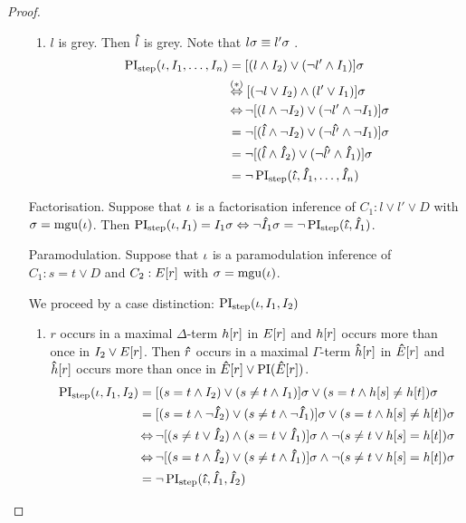 \begin{proof}
\begin{itemize}
\begin{enumerate}
				\item $l$ is grey. Then $\bm\hat{l}$ is grey. 
					Note that $l\sigma \equiv l'\sigma$ \markB.
					\nopagebreak 
					\begin{align*}
						\PIstep(\inference, I_1, \dots, I_n) 
						&=  [(l \land I_2) \lor (\lnot l'  \land I_1)]\sigma\\
						&\hspace{-1pt}\stackrel{\mathclap{\markB}}\semiff[(\lnot l \lor I_2) \land (l' \lor I_1)]\sigma\\
						 &\semiff \lnot [(l \land \lnot I_2) \lor (\lnot l'  \land \lnot I_1)]\sigma\\
						 &= \lnot [(\p l \land\lnot I_2 ) \lor (\lnot \p{l'}\land \lnot I_1 )]\sigma\\
						 &= \lnot  [(\p l \land \p I_2 ) \lor (\lnot \p{l'} \land \p I_1)]\sigma \\
						 &= \lnot \PIstep(\p \inference, \p I_1, \dots, \p I_n)
					\end{align*}
			\end{enumerate}

				\item[Factorisation.]
					Suppose that $\iota$ is a factorisation inference of $C_1: l \lor l' \lor D$
					with $\sigma = \operatorname{mgu}(\iota)$.
					Then $\operatorname{PI}_{\mathrm{step}}(\iota, I_1) = I_1\sigma \;{\operatorname{\Leftrightarrow}}\; \lnot \bm\hat{I}_1\sigma = \lnot \operatorname{PI}_{\mathrm{step}}(\bm\hat{\iota}, \bm\hat{I}_1)$.

				\item[Paramodulation.]
					Suppose that $\iota$ is a paramodulation inference of $C_1: s=t \lor D$ and $C_2: E[r]$ 
					with $\sigma = \operatorname{mgu}(\iota)$.

					We proceed by a case distinction:
					$\operatorname{PI}_{\mathrm{step}}(\iota, I_1, I_2)$

					\begin{enumerate}
						\item $r$ occurs in a maximal $\Delta$-term $h[r]$ in $E[r]$ and $h[r]$ occurs more than once in $I_2 \lor E[r]$.
							Then $\bm\hat{r}$ occurs in a maximal $\Gamma$-term $\bm\hat{h}[r]$ in $\bm\hat{E}[r]$ and $\bm\hat{h}[r]$ occurs more than once in $\bm\hat{E}[r] \lor \operatorname{PI}(\bm\hat{E}[r])$.
							\begin{align*}
								\operatorname{PI}_{\mathrm{step}}(\iota, I_1, I_2) &= [ ( s=t \land I_2 ) \lor (s\neq t \land I_1) ]\sigma \lor (s=t \land h[s] \neq h[t])\sigma\\
														&= [ ( s=t \land \lnot \bm\hat{I}_2 ) \lor (s\neq t \land \lnot \bm\hat{I}_1) ]\sigma \lor (s=t \land h[s] \neq h[t])\sigma\\
														&\operatorname{\Leftrightarrow} \lnot [ ( s\neq t \lor \bm\hat{I}_2 ) \land (s= t \lor \bm\hat{I}_1) ]\sigma \land \lnot (s\neq t \lor h[s] = h[t])\sigma\\
														&\operatorname{\Leftrightarrow} \lnot [ ( s = t \land \bm\hat{I}_2 ) \lor (s\neq t \land \bm\hat{I}_1) ]\sigma \land \lnot (s\neq t \lor h[s] = h[t])\sigma\\
													 &= \lnot \operatorname{PI}_{\mathrm{step}}(\bm\hat{\iota}, \bm\hat{I}_1, \bm\hat{I}_2)
							\end{align*}


\end{enumerate}
\end{itemize}
\end{proof}
